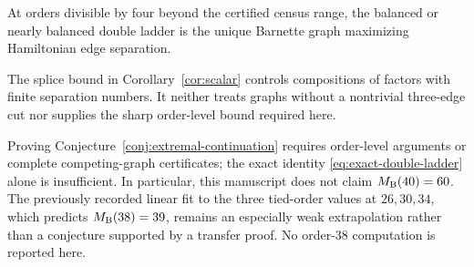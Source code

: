 \begin{conjecture}
\label{conj:extremal-continuation}
At orders divisible by four beyond the certified census range, the balanced
or nearly balanced double ladder is the unique Barnette graph maximizing
Hamiltonian edge separation.
\end{conjecture}

The splice bound in Corollary~\ref{cor:scalar} controls compositions of
factors with finite separation numbers. It neither treats graphs without a
nontrivial three-edge cut nor supplies the sharp order-level bound required
here.

Proving Conjecture~\ref{conj:extremal-continuation} requires order-level arguments or
complete competing-graph certificates; the exact identity
\eqref{eq:exact-double-ladder} alone is insufficient.  In particular, this
manuscript does not claim \(M_{\mathrm B}(40)=60\).  The previously recorded linear
fit to the three tied-order values at \(26,30,34\), which predicts
\(M_{\mathrm B}(38)=39\), remains an especially weak extrapolation rather than a
conjecture supported by a transfer proof.  No order-38 computation is reported
here.
